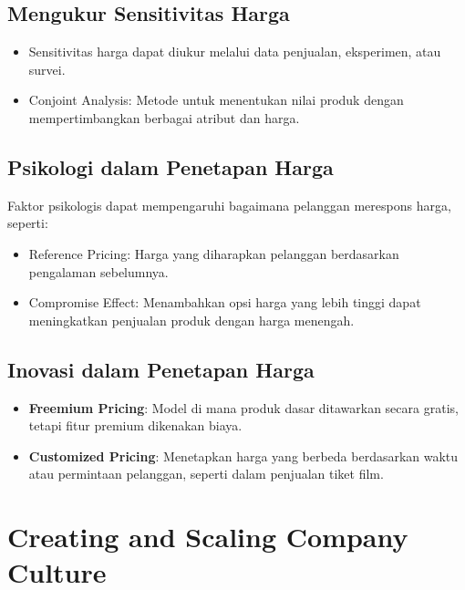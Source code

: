 \documentclass{article}
\begin{document}
\subsection{Mengukur Sensitivitas Harga}
\begin{itemize}
    \item Sensitivitas harga dapat diukur melalui data penjualan, eksperimen, atau survei.
    \item Conjoint Analysis: Metode untuk menentukan nilai produk dengan mempertimbangkan berbagai atribut dan harga.
\end{itemize}

\subsection{Psikologi dalam Penetapan Harga}
Faktor psikologis dapat mempengaruhi bagaimana pelanggan merespons harga, seperti:
\begin{itemize}
    \item Reference Pricing: Harga yang diharapkan pelanggan berdasarkan pengalaman sebelumnya.
    \item Compromise Effect: Menambahkan opsi harga yang lebih tinggi dapat meningkatkan penjualan produk dengan harga menengah.
\end{itemize}

\subsection{Inovasi dalam Penetapan Harga}
\begin{itemize}
    \item \textbf{Freemium Pricing}: Model di mana produk dasar ditawarkan secara gratis, tetapi fitur premium dikenakan biaya.
    \item \textbf{Customized Pricing}: Menetapkan harga yang berbeda berdasarkan waktu atau permintaan pelanggan, seperti dalam penjualan tiket film.
\end{itemize}

\newpage
\section{Creating and Scaling Company Culture}
\end{document}
